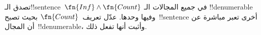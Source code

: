 \documentclass[../../../include/open-logic-section]{subfiles}
\begin{document}
\begin{prob}
تصدق الـ!!{sentence}~$\fn{Inf} \land \fn{Count}$ في جميع المجالات الـ
!!{denumerable} وفيها وحدها. عدّل تعريف~$\fn{Count}$ بحيث
تصبح~!!{sentence} أخرى تعبر مباشرة عن أن المجال~!!{denumerable}،
وأثبت أنها تفعل ذلك.
\end{prob}
\end{document}

